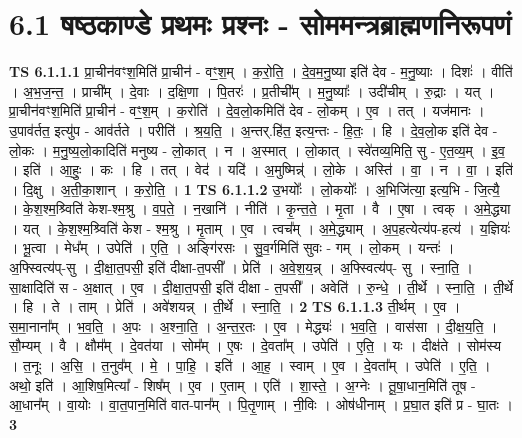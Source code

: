 \documentclass[17pt]{extarticle}
\begin{document}
\section*{ 6.1      षष्ठकाण्डे प्रथमः प्रश्नः - सोममन्त्रब्राह्मणनिरूपणं }
                                \textbf{ TS 6.1.1.1} \newline
                  प्रा॒चीन॑वꣳश॒मिति॑ प्रा॒चीन॑ - वꣳ॒॒श॒म् । क॒रो॒ति॒ । दे॒व॒म॒नु॒ष्या इति॑ देव - म॒नु॒ष्याः । दिशः॑ । वीति॑ । अ॒भ॒ज॒न्त॒ । प्राची᳚म् । दे॒वाः । द॒क्षि॒णा । पि॒तरः॑ । प्र॒तीची᳚म् । म॒नु॒ष्याः᳚ । उदी॑चीम् । रु॒द्राः । यत् । प्रा॒चीन॑वꣳश॒मिति॑ प्रा॒चीन॑ - वꣳ॒॒श॒म् । क॒रोति॑ । दे॒व॒लो॒कमिति॑ देव - लो॒कम् । ए॒व । तत् । यज॑मानः । उ॒पाव॑र्तत॒ इत्यु॑प - आव॑र्तते । परीति॑ । श्र॒य॒ति॒ । अ॒न्तर्.हि॑त॒ इत्य॒न्तः - हि॒तः॒ । हि । दे॒व॒लो॒क इति॑ देव - लो॒कः । म॒नु॒ष्य॒लो॒कादिति॑ मनुष्य - लो॒कात् । न । अ॒स्मात् । लो॒कात् । स्वे॑तव्य॒मिति॒ सु - ए॒त॒व्य॒म् । इ॒व॒ । इति॑ । आ॒हुः॒ । कः । हि । तत् । वेद॑ । यदि॑ । अ॒मुष्मिन्न्॑ । लो॒के । अस्ति॑ । वा॒ । न । वा॒ । इति॑ । दि॒क्षु । अ॒ती॒का॒शान् । क॒रो॒ति॒ । \textbf{  1} \newline
                  \newline
                                \textbf{ TS 6.1.1.2} \newline
                  उ॒भयोः᳚ । लो॒कयोः᳚ । अ॒भिजि॑त्या॒ इत्य॒भि - जि॒त्यै॒ । के॒श॒श्म॒श्र्विति॑ केश-श्म॒श्रु । व॒प॒ते॒ । न॒खानि॑ । नीति॑ । कृ॒न्त॒ते॒ । मृ॒ता । वै । ए॒षा । त्वक् । अ॒मे॒द्ध्या । यत् । के॒श॒श्म॒श्र्विति॑ केश - श्म॒श्रु । मृ॒ताम् । ए॒व । त्वच᳚म् । अ॒मे॒द्ध्याम् । अ॒प॒हत्येत्य॑प-हत्य॑ । य॒ज्ञियः॑ । भू॒त्वा । मेध᳚म् । उपेति॑ । ए॒ति॒ । अङ्गि॑रसः । सु॒व॒र्गमिति॑ सुवः - गम् । लो॒कम् । यन्तः॑ । अ॒फ्स्वित्य॑प्-सु । दी॒क्षा॒त॒पसी॒ इति॑ दीक्षा-त॒पसी᳚ । प्रेति॑ । अ॒वे॒श॒य॒न्न् । अ॒फ्स्वित्य॑प्- सु । स्ना॒ति॒ । सा॒क्षादिति॑ स - अ॒क्षात् । ए॒व । दी॒क्षा॒त॒पसी॒ इति॑ दीक्षा - त॒पसी᳚ । अवेति॑ । रु॒न्धे॒ । ती॒र्थे । स्ना॒ति॒ । ती॒र्थे । हि । ते । ताम् । प्रेति॑ । अवे॑शयन्न् । ती॒र्थे । स्ना॒ति॒ । \textbf{  2} \newline
                  \newline
                                \textbf{ TS 6.1.1.3} \newline
                  ती॒र्थम् । ए॒व । स॒मा॒नाना᳚म् । भ॒व॒ति॒ । अ॒पः । अ॒श्ना॒ति॒ । अ॒न्त॒र॒तः । ए॒व । मेद्ध्यः॑ । भ॒व॒ति॒ । वास॑सा । दी॒क्ष॒य॒ति॒ । सौ॒म्यम् । वै । क्षौम᳚म् । दे॒वत॑या । सोम᳚म् । ए॒षः । दे॒वता᳚म् । उपेति॑ । ए॒ति॒ । यः । दीक्ष॑ते । सोम॑स्य । त॒नूः । अ॒सि॒ । त॒नुव᳚म् । मे॒ । पा॒हि॒ । इति॑ । आ॒ह॒ । स्वाम् । ए॒व । दे॒वता᳚म् । उपेति॑ । ए॒ति॒ । अथो॒ इति॑ । आ॒शिष॒मित्या᳚ - शिष᳚म् । ए॒व । ए॒ताम् । एति॑ । शा॒स्ते॒ । अ॒ग्नेः । तू॒षा॒धान॒मिति॑ तूष - आ॒धान᳚म् । वा॒योः । वा॒त॒पान॒मिति॑ वात-पान᳚म् । पि॒तृ॒णाम् । नी॒विः । ओष॑धीनाम् । प्र॒घा॒त इति॑ प्र - घा॒तः । \textbf{  3} \newline
\end{document}
